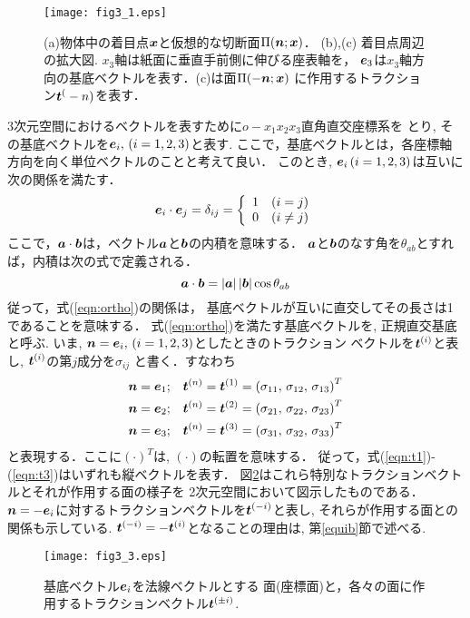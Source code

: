 \documentclass[10pt,a4j]{jbook}
\begin{document}
\begin{figure}[h]
	\begin{center}
	\texttt{[image: fig3\_1.eps]} 
	\end{center}
	\caption{(a)物体中の着目点$\mbox{\boldmath $x$}$と仮想的な切断面$\Pi(\mbox{\boldmath $n$};\mbox{\boldmath $x$})$．
	(b),(c) 着目点周辺の拡大図.
	$x_3$軸は紙面に垂直手前側に伸びる座表軸を，
	$\mbox{\boldmath $e$}_3$は$x_3$軸方向の基底ベクトルを表す．(c)は面$\Pi(-\mbox{\boldmath $n$};\mbox{\boldmath $x$})$
	に作用するトラクション$\mbox{\boldmath $t$}^(-n)$を表す．} 
	\label{fig:fig3_1}
\end{figure}
3次元空間におけるベクトルを表すために$o-x_1x_2x_3$直角直交座標系を
とり, その基底ベクトルを$\mbox{\boldmath $e$}_i,\, (i=1,2,3)$と表す.
ここで，基底ベクトルとは，各座標軸方向を向く単位ベクトルのことと考えて良い．
このとき, $\mbox{\boldmath $e$}_i\, (i=1,2,3)$は互いに次の関係を満たす．
\begin{equation}
	\mbox{\boldmath $e$}_i\cdot \mbox{\boldmath $e$}_j=
	\delta_{ij}=
	\left\{
	\begin{array}{cc}
		1 & (i=j) \\
		0 & (i \neq j) \\
	\end{array}
	\right.
	\label{eqn:ortho}
\end{equation}
ここで，$\mbox{\boldmath $a$} \cdot \mbox{\boldmath $b$}$は，ベクトル$\mbox{\boldmath $a$}$と$\mbox{\boldmath $b$}$の内積を意味する．
$\mbox{\boldmath $a$}$と$\mbox{\boldmath $b$}$のなす角を$\theta_{ab}$とすれば，内積は次の式で定義される．
\begin{equation}
	\mbox{\boldmath $a$}\cdot\mbox{\boldmath $b$}=
	\left|\mbox{\boldmath $a$}\right|
	\left|\mbox{\boldmath $b$}\right|
	\cos \theta_{ab}
\end{equation}
従って，式(\ref{eqn:ortho})の関係は， 基底ベクトルが互いに直交してその長さは1であることを意味する．
式(\ref{eqn:ortho})を満たす基底ベクトルを, 正規直交基底と呼ぶ.
いま, $\mbox{\boldmath $n$}=\mbox{\boldmath $e$}_i,\, (i=1,2,3)$としたときのトラクション
ベクトルを$\mbox{\boldmath $t$}^{(i)}$と表し, $\mbox{\boldmath $t$}^{(i)}$の第$j$成分を$\sigma_{ij}$
と書く．すなわち
\begin{eqnarray}
	\mbox{\boldmath $n$}=\mbox{\boldmath $e$}_1 &;& \mbox{\boldmath $t$}^{(n)}=\mbox{\boldmath $t$}^{(1)}
		=\left( \sigma_{11},\, \sigma_{12},\, \sigma_{13}\right)^T 
		\label{eqn:t1}
		\\
	\mbox{\boldmath $n$}=\mbox{\boldmath $e$}_2 &;& \mbox{\boldmath $t$}^{(n)}=\mbox{\boldmath $t$}^{(2)} 
		=\left( \sigma_{21},\, \sigma_{22},\, \sigma_{23}\right)^T 
		\label{eqn:t2}
		\\
	\mbox{\boldmath $n$}=\mbox{\boldmath $e$}_3 &;& \mbox{\boldmath $t$}^{(n)}=\mbox{\boldmath $t$}^{(3)} 
		=\left( \sigma_{31},\, \sigma_{32},\, \sigma_{33}\right)^T 
		\label{eqn:t3}
\end{eqnarray}
と表現する．ここに$(\cdot)^T$は, $(\cdot)$の転置を意味する．
従って，式(\ref{eqn:t1})-(\ref{eqn:t3})はいずれも縦ベクトルを表す．
図\ref{fig:fig3_3}はこれら特別なトラクションベクトルとそれが作用する面の様子を
2次元空間において図示したものである．
$\mbox{\boldmath $n$}=-\mbox{\boldmath $e$}_i$に対するトラクションベクトルを$\mbox{\boldmath $t$}^{(-i)}$と表し, 
それらが作用する面との関係も示している.
$\mbox{\boldmath $t$}^{(-i)}=-\mbox{\boldmath $t$}^{(i)}$となることの理由は, 第\ref{equib}節で述べる.
\begin{figure}[h]
	\begin{center}
	\texttt{[image: fig3\_3.eps]} 
	\end{center}
	\caption{基底ベクトル$\mbox{\boldmath $e$}_i$を法線ベクトルとする
	面(座標面)と，各々の面に作用するトラクションベクトル$\mbox{\boldmath $t$}^{(\pm i)}$.}
	\label{fig:fig3_3}
\end{figure}
\end{document}
